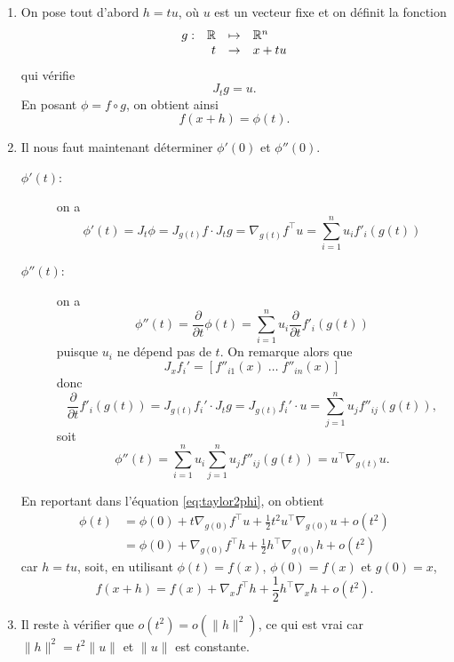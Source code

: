   \begin{enumerate}
    \item On pose tout d'abord $h = t u$, où $u$ est un vecteur fixe et on définit la fonction 
    $$
      \begin{array}{rrcl}
        g : & \mathbb{R} & \mapsto & \mathbb{R}^n \\
        & t & \rightarrow & x + t u
      \end{array}
    $$
    qui vérifie
    $$
    J_t g = u.
    $$
    En posant $\phi = f \circ g$, on obtient ainsi
    $$
    f(x + h) = \phi(t).
    $$
    \item Il nous faut maintenant déterminer $\phi'(0)$ et $\phi''(0)$.
    \begin{description}
      \item[$\phi'(t)$:] on a
        $$
        \phi'(t) = J_t \phi 
        = J_{g(t)} f \cdot J_t g
        = \nabla_{g(t)}f^\top u
        = \sum_{i=1}^n u_i f'_i(g(t))
        $$
      \item[$\phi''(t)$:] on a
      $$
      \phi''(t) 
      = \frac{\partial}{\partial t} \phi(t)
      = \sum_{i=1}^n u_i \frac{\partial}{\partial t} f'_i(g(t))
      $$
      puisque $u_i$ ne dépend pas de $t$. On remarque alors que
      $$
      J_x f_i' = [f''_{i1}(x) \; \dots \; f''_{in}(x)]
      $$
      donc
      $$
      \frac{\partial}{\partial t} f'_i(g(t)) 
      = J_{g(t)} f_i' \cdot J_t g
      = J_{g(t)} f_i' \cdot u
      = \sum_{j=1}^n u_j f''_{ij}(g(t)),
      $$
      soit
      $$
      \phi''(t) 
      = \sum_{i=1}^n u_i \sum_{j=1}^n u_j f''_{ij}(g(t))
      = u^\top \nabla_{g(t)} u.
      $$
    \end{description}
    En reportant dans l'équation \eqref{eq:taylor2phi}, on obtient
    \begin{align*}
      \phi(t) 
      & = \phi(0) + t \nabla_{g(0)}f^\top u + \frac12 t^2 u^\top \nabla_{g(0)} u + o(t^2) \\
      & = \phi(0) + \nabla_{g(0)}f^\top h + \frac12 h^\top \nabla_{g(0)} h + o(t^2)
    \end{align*}
    car $h = tu$, soit, en utilisant $\phi(t) = f(x)$, $\phi(0) = f(x)$ et $g(0) = x$,
    $$
    f(x+h) 
    = f(x) + \nabla_{x}f^\top h + \frac12 h^\top \nabla_{x} h + o(t^2).
    $$
    \item Il reste à vérifier que $o(t^2) = o(\|h\|^2)$, ce qui est vrai car $\|h\|^2 = t^2 \|u\|$ et $\|u\|$ est constante.
  \end{enumerate}
\eproof

